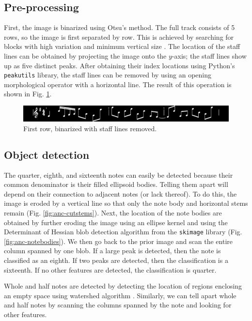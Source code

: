 \documentclass[12pt,a4paper]{article}
\begin{document}
\subsection{Pre-processing}
First, the image is binarized using Otsu's method. The full track consists of 5 rows, so the image is first separated by row. This is achieved by searching for blocks with high variation and minimum vertical size \cite{vangent}. The location of the staff lines can be obtained by projecting the image onto the $y$-axis; the staff lines show up as five distinct peaks. After obtaining their index locations using Python's \texttt{peakutils} library, the staff lines can be removed by using an opening morphological operator with a horizontal line. The result of this operation is shown in Fig. \ref{fig:anc-nolines}.

\begin{figure}[htb]
	\centering
	\includegraphics[width=\textwidth]{anc_nolines.png}
	\caption{First row, binarized with staff lines removed.}
	\label{fig:anc-nolines}
\end{figure}

\subsection{Object detection}
The quarter, eighth, and sixteenth notes can easily be detected because their common denominator is their filled ellipsoid bodies. Telling them apart will depend on their connection to adjacent notes (or lack thereof). To do this, the image is eroded by a vertical line so that only the note body and horizontal stems remain (Fig. \ref{fig:anc-cutstems}). Next, the location of the note bodies are obtained by further eroding the image using an ellipse kernel and using the Determinant of Hessian blob detection algorithm from the \texttt{skimage} library (Fig. \ref{fig:anc-notebodies}). We then go back to the prior image and scan the entire column spanned by one blob. If a large peak is detected, then the note is classified as an eighth. If two peaks are detected, then the classification is a sixteenth. If no other features are detected, the classification is quarter.

Whole and half notes are detected by detecting the location of regions enclosing an empty space using watershed algorithm \cite{bieniek}. Similarly, we can tell apart whole and half notes by scanning the columns spanned by the note and looking for other features.
\end{document}
